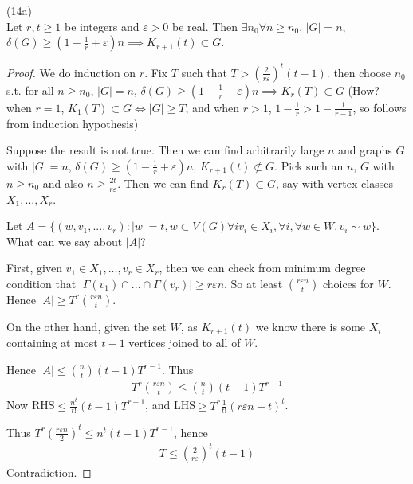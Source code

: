 \documentclass[a4paper]{article}
\begin{document}
\begin{thm} (14a)\\
Let $r,t \geq 1$ be integers and $\varepsilon>0$ be real. Then $\exists n_0 \forall n \geq n_0$, $|G| = n$, $\delta(G) \geq (1-\frac{1}{r} +\varepsilon)n \implies K_{r+1} (t) \subset G$.
\begin{proof}
We do induction on $r$. Fix $T$ such that $T > (\frac{2}{r\varepsilon})^t (t-1)$.
then choose $n_0$ s.t. for all $n \geq n_0$, $|G| = n$, $\delta(G) \geq (1-\frac{1}{r}+\varepsilon)n \implies K_r(T) \subset G$ (How? when $r=1$, $K_1(T) \subset G \iff |G| \geq T$, and when $r>1$, $1-\frac{1}{r} > 1-\frac{1}{r-1}$, so follows from induction hypothesis)

Suppose the result is not true. Then we can find arbitrarily large $n$ and graphs $G$ with $|G| = n$, $\delta(G) \geq (1-\frac{1}{r}+\varepsilon)n$, $K_{r+1}(t) \not\subset G$. Pick such an $n$, $G$ with $n \geq n_0$ and also $n \geq \frac{2t}{r\varepsilon}$.
Then we can find $K_r(T) \subset G$, say with vertex classes $X_1,...,X_r$.

Let $A = \{(w,v_1,...,v_r):|w|=t,w \subset V(G) \forall i v_i \in X_i, \forall i, \forall w \in W, v_i \sim w\}$. What can we say about $|A|$?

First, given $v_1 \in X_1,...,v_r \in X_r$, then we can check from minimum degree condition that $|\Gamma(v_1) \cap ... \cap \Gamma(v_r)| \geq r \varepsilon n$. So at least ${r \varepsilon n \choose t}$ choices for $W$. Hence $|A| \geq T^r {r \varepsilon n \choose t}$.

On the other hand, given the set $W$, as $K_{r+1}(t)$ we know there is some $X_i$ containing at most $t-1$ vertices joined to all of $W$.

Hence $|A| \leq {n \choose t} (t-1) T^{r-1}$. Thus
\begin{equation*}
\begin{aligned}
T^r {r\varepsilon n \choose t} \leq {n \choose t} (t-1) T^{r-1}
\end{aligned}
\end{equation*}
Now RHS$\leq \frac{n^t}{t!}(t-1) T^{r-1}$, and LHS$\geq T^r \frac{1}{t!} (r\varepsilon n - t)^t$.

Thus $T^r (\frac{r\varepsilon n}{2})^t \leq n^t (t-1) T^{r-1}$, hence
\begin{equation*}
\begin{aligned}
T \leq (\frac{2}{r\varepsilon})^t (t-1)
\end{aligned}
\end{equation*}
Contradiction.
\end{proof}
\end{thm}
\end{document}
